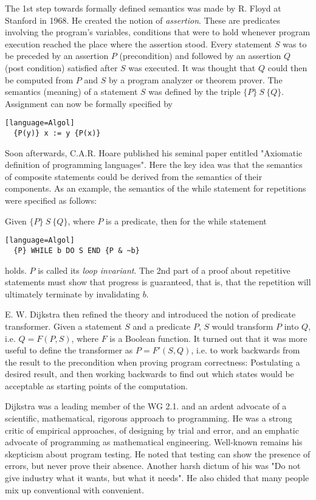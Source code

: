 The 1st step towards formally defined semantics was made by R. Floyd at
Stanford in 1968. He created the notion of \emph{assertion}. These are
predicates involving the program's variables, conditions that were to hold
whenever program execution reached the place where the assertion stood. Every
statement $S$ was to be preceded by an assertion $P$ (precondition) and followed
by an assertion $Q$ (post condition) satisfied after $S$ was executed. It was
thought that $Q$ could then be computed from $P$ and $S$ by a program analyzer
or theorem prover. The semantics (meaning) of a statement $S$ was defined by
the triple $\{P\}\ S\ \{Q\}$. Assignment can now be formally specified by
\begin{verbatim}[language=Algol]
  {P(y)} x := y {P(x)}
\end{verbatim}

Soon afterwards, C.A.R. Hoare published his seminal paper entitled "Axiomatic
definition of programming languages". Here the key idea was that the semantics of
composite statements could be derived from the semantics of their components.
As an example, the semantics of the while statement for repetitions were specified
as follows:

Given $\{P\}\ S\ \{Q\}$, where $P$ is a predicate, then for the while statement
\begin{verbatim}[language=Algol]
  {P} WHILE b DO S END {P & ~b}
\end{verbatim}
holds. $P$ is called its \emph{loop invariant}. The 2nd part of a proof about repetitive
statements must show that progress is guaranteed, that is, that the repetition will
ultimately terminate by invalidating $b$.

E. W. Dijkstra then refined the theory and introduced the notion of predicate
transformer. Given a statement $S$ and a predicate $P$, $S$ would transform $P$ into
$Q$, i.e. $Q = F(P, S)$, where $F$ is a Boolean function. It turned out that it was
more useful to define the transformer as $P = F'(S, Q)$, i.e. to work backwards from
the result to the precondition when proving program correctness: Postulating a desired
result, and then working backwards to find out which states would be acceptable as
starting points of the computation.

Dijkstra was a leading member of the WG 2.1. and an ardent advocate of a scientific,
mathematical, rigorous approach to programming. He was a strong critic of empirical
approaches, of designing by trial and error, and an emphatic advocate of programming
as mathematical engineering. Well-known remains his skepticism about program testing.
He noted that testing can show the presence of errors, but never prove their absence.
Another harsh dictum of his was "Do not give industry what it wants, but what it needs".
He also chided that many people mix up conventional with convenient.

